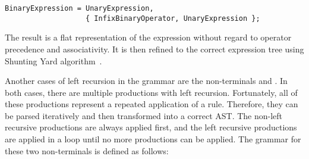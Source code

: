 \begin{verbatim}
BinaryExpression = UnaryExpression,
                   { InfixBinaryOperator, UnaryExpression };
\end{verbatim}

The result is a flat representation of the expression without regard to operator precedence and associativity. It is then refined to the correct expression tree using Shunting Yard algorithm~\cite{algol60}.

Another cases of left recursion in the grammar are the non-terminals \nonterminal[MemberExpression]{}{} and \nonterminal[CallExpression]{}{}. In both cases, there are multiple productions with left recursion. Fortunately, all of these productions represent a repeated application of a rule. Therefore, they can be parsed iteratively and then transformed into a correct AST. The non-left recursive productions are always applied first, and the left recursive productions are applied in a loop until no more productions can be applied. The grammar for these two non-terminals is defined as follows:



